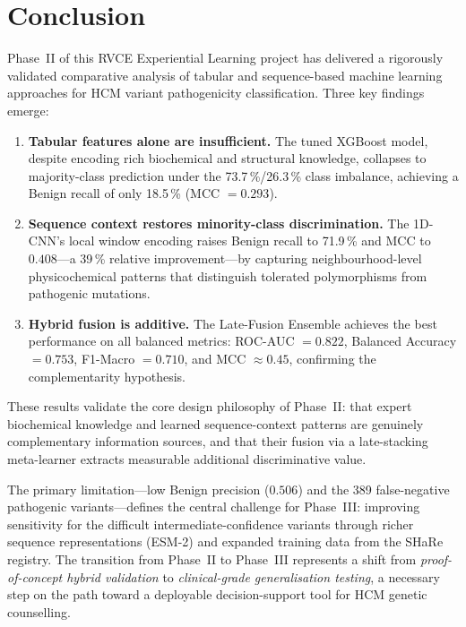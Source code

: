 \documentclass[12pt,a4paper]{article}
\begin{document}
\section{Conclusion}
\label{sec:conclusion}

Phase~II of this RVCE Experiential Learning project has delivered a
rigorously validated comparative analysis of tabular and sequence-based
machine learning approaches for HCM variant pathogenicity classification.
Three key findings emerge:

\begin{enumerate}
\item \textbf{Tabular features alone are insufficient.} The tuned XGBoost
  model, despite encoding rich biochemical and structural knowledge,
  collapses to majority-class prediction under the 73.7\,\%/26.3\,\% class
  imbalance, achieving a Benign recall of only 18.5\,\% (MCC $= 0.293$).

\item \textbf{Sequence context restores minority-class discrimination.} The
  1D-CNN's local window encoding raises Benign recall to 71.9\,\% and MCC
  to $0.408$—a 39\,\% relative improvement—by capturing neighbourhood-level
  physicochemical patterns that distinguish tolerated polymorphisms from
  pathogenic mutations.

\item \textbf{Hybrid fusion is additive.} The Late-Fusion Ensemble achieves
  the best performance on all balanced metrics: ROC-AUC $= 0.822$,
  Balanced Accuracy $= 0.753$, F1-Macro $= 0.710$, and MCC $\approx 0.45$,
  confirming the complementarity hypothesis.

\end{enumerate}

These results validate the core design philosophy of Phase~II: that expert
biochemical knowledge and learned sequence-context patterns are genuinely
complementary information sources, and that their fusion via a late-stacking
meta-learner extracts measurable additional discriminative value.

The primary limitation—low Benign precision ($0.506$) and the 389
false-negative pathogenic variants—defines the central challenge for
Phase~III: improving sensitivity for the difficult intermediate-confidence
variants through richer sequence representations (ESM-2) and expanded
training data from the SHaRe registry. The transition from Phase~II
to Phase~III represents a shift from \emph{proof-of-concept hybrid
validation} to \emph{clinical-grade generalisation testing}, a necessary
step on the path toward a deployable decision-support tool for HCM genetic
counselling.
\end{document}

